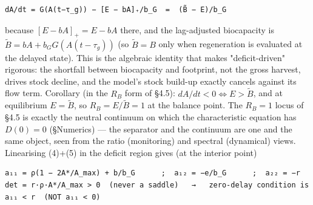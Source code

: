 \documentclass[11pt]{article}
\begin{document}
\begingroup\small\begin{verbatim}
dA/dt = G(A(t−τ_g)) − [E − bA]₊/b_G  =  (B̃ − E)/b_G
\end{verbatim}\endgroup

because $[E - bA]_{+} = E - bA$ there, and the lag-adjusted biocapacity is $\tilde{B} = bA + b_{G} G(A(t-\tau{}_{g}))$ (so $\tilde{B} = B$ only when regeneration is evaluated at the delayed state). This is the algebraic identity that makes "deficit-driven" rigorous: the shortfall between biocapacity and footprint, not the gross harvest, drives stock decline, and the model's stock build-up exactly cancels against its flow term. Corollary (in the $R_{B}$ form of §4.5): $dA/dt < 0 \iff{} E > \tilde{B}$, and at equilibrium $E = \tilde{B}$, so $R_{B} = E/\tilde{B} = 1$ at the balance point. The $R_{B} = 1$ locus of §4.5 is exactly the neutral continuum on which the characteristic equation has $D(0) = 0$ (§Numerics) — the separator and the continuum are one and the same object, seen from the ratio (monitoring) and spectral (dynamical) views. Linearising (4)+(5) in the deficit region gives (at the interior point)

\begingroup\small\begin{verbatim}
a₁₁ = ρ(1 − 2A*/A_max) + b/b_G      ;  a₁₂ = −e/b_G      ;  a₂₂ = −r
det = r·ρ·A*/A_max > 0  (never a saddle)   →   zero-delay condition is  a₁₁ < r  (NOT a₁₁ < 0)
\end{verbatim}\endgroup
\end{document}
